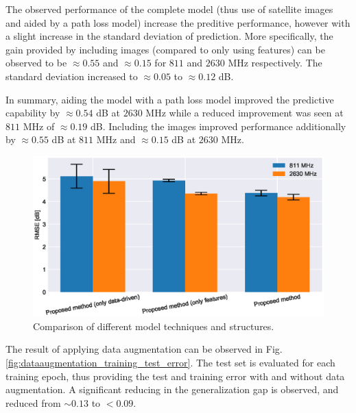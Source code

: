 The observed performance of the complete model (thus use of satellite images and aided by a path loss model) increase the preditive performance, however with a slight increase in the standard deviation of prediction. More specifically, the gain provided by including images (compared to only using features) can be observed to be $\approx 0.55$ and $\approx 0.15$ for $811$ and $2630$ MHz respectively. The standard deviation increased to $\approx 0.05$ to $\approx 0.12$ dB. 

In summary, aiding the model with a path loss model improved the predictive capability by $\approx 0.54$ dB at $2630$ MHz while a reduced improvement was seen at $811$ MHz of $\approx 0.19$ dB. Including the images improved performance additionally by $\approx 0.55$ dB at $811$ MHz and $\approx 0.15$ dB at $2630$ MHz.

\begin{figure}
    \centering
    \includegraphics{chapters/part_pathloss/model_aided_paper/trainedmodels_barplot.eps}
    \caption{Comparison of different model techniques and structures.}
    \label{fig:train_models_barplot}
\end{figure}

The result of applying data augmentation can be observed in Fig. \ref{fig:dataaugmentation_training_test_error}. The test set is evaluated for each training epoch, thus providing the test and training error with and without data augmentation. A significant reducing in the generalization gap is observed, and reduced from $\sim 0.13$ to $< 0.09$. 


